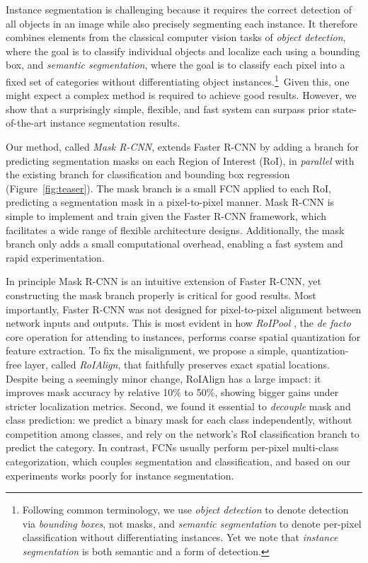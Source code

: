 \documentclass[10pt,twocolumn,letterpaper]{article}
\begin{document}
Instance segmentation is challenging because it requires the correct detection of all objects in an image while also precisely segmenting each instance. It therefore combines elements from the classical computer vision tasks of \emph{object detection}, where the goal is to classify individual objects and localize each using a bounding box, and \emph{semantic segmentation}, where the goal is to classify each pixel into a fixed set of categories without differentiating object instances.\footnote{Following common terminology, we use \emph{object detection} to denote detection via \emph{bounding boxes}, not masks, and \emph{semantic segmentation} to denote per-pixel classification without differentiating instances. Yet we note that \emph{instance segmentation} is both semantic and a form of detection.}~Given this, one might expect a complex method is required to achieve good results. However, we show that a surprisingly simple, flexible, and fast system can surpass prior state-of-the-art instance segmentation results.

Our method, called \emph{Mask R-CNN}, extends Faster R-CNN \cite{Ren2015a} by adding a branch for predicting segmentation masks on each Region of Interest (RoI), in \emph{parallel} with the existing branch for classification and bounding box regression (Figure~\ref{fig:teaser}). The mask branch is a small FCN applied to each RoI, predicting a segmentation mask in a pixel-to-pixel manner. Mask R-CNN is simple to implement and train given the Faster R-CNN framework, which facilitates a wide range of flexible architecture designs. Additionally, the mask branch only adds a small computational overhead, enabling a fast system and rapid experimentation.

In principle Mask R-CNN is an intuitive extension of Faster R-CNN, yet constructing the mask branch properly is critical for good results. Most importantly, Faster R-CNN was not designed for pixel-to-pixel alignment between network inputs and outputs. This is most evident in how \emph{RoIPool} \cite{He2014,Girshick2015a}, the \emph{de facto} core operation for attending to instances, performs coarse spatial quantization for feature extraction. To fix the misalignment, we propose a simple, quantization-free layer, called \emph{RoIAlign}, that faithfully preserves exact spatial locations. Despite being a seemingly minor change, RoIAlign has a large impact: it improves mask accuracy by relative 10\% to 50\%, showing bigger gains under stricter localization metrics. Second, we found it essential to \emph{decouple} mask and class prediction: we predict a binary mask for each class independently, without competition among classes, and rely on the network's RoI classification branch to predict the category. In contrast, FCNs usually perform per-pixel multi-class categorization, which couples segmentation and classification, and based on our experiments works poorly for instance segmentation.
\end{document}
